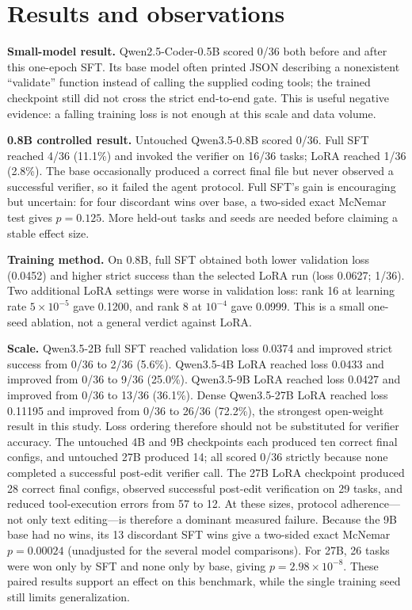 \documentclass[11pt]{article}
\begin{document}
\section{Results and observations}

\textbf{Small-model result.}  Qwen2.5-Coder-0.5B scored 0/36 both before and
after this one-epoch SFT.  Its base model often printed JSON describing a
nonexistent ``validate'' function instead of calling the supplied coding tools;
the trained checkpoint still did not cross the strict end-to-end gate.  This is
useful negative evidence: a falling training loss is not enough at this scale
and data volume.

\textbf{0.8B controlled result.}  Untouched Qwen3.5-0.8B scored 0/36.  Full SFT
reached 4/36 (11.1\%) and invoked the verifier on 16/36 tasks; LoRA reached
1/36 (2.8\%).  The base occasionally produced a correct final file but never
observed a successful verifier, so it failed the agent protocol.  Full SFT's
gain is encouraging but uncertain: for four discordant wins over base, a
two-sided exact McNemar test gives $p=0.125$.  More held-out tasks and seeds are
needed before claiming a stable effect size.

\textbf{Training method.}  On 0.8B, full SFT obtained both lower validation loss
(0.0452) and higher strict success than the selected LoRA run (loss 0.0627;
1/36).  Two additional LoRA settings were worse in validation loss: rank 16 at
learning rate $5\times10^{-5}$ gave 0.1200, and rank 8 at $10^{-4}$ gave
0.0999.  This is a small one-seed ablation, not a general verdict against LoRA.

\textbf{Scale.}  Qwen3.5-2B full SFT reached validation loss 0.0374 and improved
strict success from 0/36 to 2/36 (5.6\%).  Qwen3.5-4B LoRA reached loss 0.0433
and improved from 0/36 to 9/36 (25.0\%).  Qwen3.5-9B LoRA reached loss 0.0427
and improved from 0/36 to 13/36 (36.1\%).  Dense Qwen3.5-27B LoRA reached loss
0.11195 and improved from 0/36 to 26/36 (72.2\%), the strongest open-weight
result in this study.  Loss ordering therefore should not be substituted for
verifier accuracy.  The untouched 4B and 9B checkpoints each produced ten
correct final configs, and untouched 27B produced 14; all scored 0/36 strictly
because none completed a successful post-edit verifier call.  The 27B LoRA
checkpoint produced 28 correct final configs, observed successful post-edit
verification on 29 tasks, and reduced tool-execution errors from 57 to 12.
At these sizes, protocol adherence---not only text editing---is therefore a
dominant measured failure.
Because the 9B base had no wins, its 13 discordant SFT wins give a two-sided
exact McNemar $p=0.00024$ (unadjusted for the several model comparisons).
For 27B, 26 tasks were won only by SFT and none only by base, giving
$p=2.98\times10^{-8}$.  These paired results support an effect on this
benchmark, while the single training seed still limits generalization.
\end{document}
